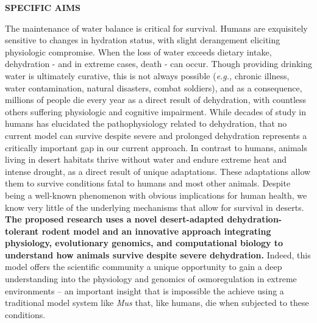 %
%
%
%
%

\noindent \textbf{SPECIFIC AIMS}

The maintenance of water balance is critical for survival. Humans are exquisitely sensitive to changes in hydration status, with slight derangement eliciting physiologic compromise. When the loss of water exceeds dietary intake, dehydration - and in extreme cases, death - can occur. Though providing drinking water is ultimately curative, this is not always possible (\textit{e.g.,}  chronic illness, water contamination, natural disasters, combat soldiers), and as a consequence, millions of people die every year as a direct result of dehydration, with countless others suffering physiologic and cognitive impairment. While decades of study in humans has elucidated the pathophysiology related to dehydration, that no current model can survive despite severe and prolonged dehydration represents a critically important gap in our current approach. In contrast to humans, animals living in desert habitats thrive without water and endure extreme heat and intense drought, as a direct result of unique adaptations. These adaptations allow them to survive conditions fatal to humans and most other animals. Despite being a well-known phenomenon with obvious implications for human health, we know very little of the underlying mechanisms that allow for survival in deserts. \textbf{The proposed research uses a novel desert-adapted dehydration-tolerant rodent model and an innovative approach integrating physiology, evolutionary genomics, and computational biology to understand how animals survive despite severe dehydration.} Indeed, this model offers the scientific community a unique opportunity to gain a deep understanding into the physiology and genomics of osmoregulation in extreme environments – an important insight that is impossible the achieve using a traditional model system like \textit{Mus} that, like humans, die when subjected to these conditions.

